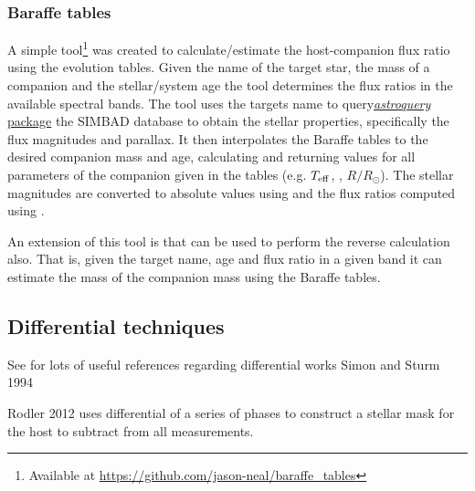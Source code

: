 \subsubsection{Baraffe tables}
\label{subsubsec:baraffe_tables_code}
A simple tool\footnote{Available at \url{https://github.com/jason-neal/baraffe_tables}} was created to calculate/estimate the host-companion flux ratio using the \citet{baraffe_evolutionary_2003,baraffe_new_2015} evolution tables.
Given the name of the target star, the mass of a companion and the stellar/system age the tool determines the flux ratios in the available spectral bands.
The tool uses the targets name to query\href{https://zenodo.org/record/1160627}{\emph{astroquery} package} the {SIMBAD} database to obtain the stellar properties, specifically the flux magnitudes and parallax. It then interpolates the Baraffe tables to the desired companion mass and age, calculating and returning values for all parameters of the companion given in the tables (e.g. \(T_{\mathrm{eff}}\), \logg, \(R/R_{\odot}\)).
The stellar magnitudes are converted to absolute values using  and the flux ratios computed using  .

An extension of this tool is that can be used to perform the reverse calculation also. That is, given the target name, age and flux ratio in a given band it can estimate the mass of the companion mass using the Baraffe tables.










\subsection{Differential techniques}
See \citet{kostov... 2013} for lots of useful references regarding differential works Simon and Sturm 1994

Rodler 2012 uses differential of a series of phases to construct a stellar mask for the host to subtract from all measurements.
